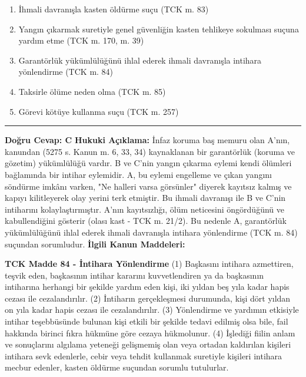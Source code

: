 \documentclass[a4paper, 11pt, twocolumn]{article}
\newenvironment{lawbox}{%
    \par\noindent
    \begin{tcolorbox}[
        colback=lawbg,
        colframe=boxcolor,
        fonttitle=\bfseries,
        boxrule=0.5pt,
        left=3pt,
        right=3pt,
        top=3pt,
        bottom=3pt,
        width=\columnwidth,
        arc=2pt,
        before skip=0.2cm,
        after skip=0.2cm
    ]
    \footnotesize\itshape
}{\end{tcolorbox}}
\begin{document}
\begin{enumerate}[label=\Alph*)]
    \item İhmali davranışla kasten öldürme suçu (TCK m. 83)
    \item Yangın çıkarmak suretiyle genel güvenliğin kasten tehlikeye sokulması suçuna yardım etme (TCK m. 170, m. 39)
    \item Garantörlük yükümlülüğünü ihlal ederek ihmali davranışla intihara yönlendirme (TCK m. 84)
    \item Taksirle ölüme neden olma (TCK m. 85)
    \item Görevi kötüye kullanma suçu (TCK m. 257)
\end{enumerate}
\vspace{0.5cm}
\hrule
\vspace{0.5cm}
\textbf{Doğru Cevap: C}
\newline
\textbf{Hukuki Açıklama:} İnfaz koruma baş memuru olan A'nın, kanundan (5275 s. Kanun m. 6, 33, 34) kaynaklanan bir garantörlük (koruma ve gözetim) yükümlülüğü vardır. B ve C'nin yangın çıkarma eylemi kendi ölümleri bağlamında bir intihar eylemidir. A, bu eylemi engelleme ve çıkan yangını söndürme imkânı varken, "Ne halleri varsa görsünler" diyerek kayıtsız kalmış ve kapıyı kilitleyerek olay yerini terk etmiştir. Bu ihmali davranışı ile B ve C'nin intiharını kolaylaştırmıştır. A'nın kayıtsızlığı, ölüm neticesini öngördüğünü ve kabullendiğini gösterir (olası kast - TCK m. 21/2). Bu nedenle A, garantörlük yükümlülüğünü ihlal ederek ihmali davranışla intihara yönlendirme (TCK m. 84) suçundan sorumludur.
\vspace{0.5cm}
\textbf{İlgili Kanun Maddeleri:}
\begin{lawbox}
\textbf{TCK Madde 84 - İntihara Yönlendirme}
\newline
(1) Başkasını intihara azmettiren, teşvik eden, başkasının intihar kararını kuvvetlendiren ya da başkasının intiharına herhangi bir şekilde yardım eden kişi, iki yıldan beş yıla kadar hapis cezası ile cezalandırılır.
\newline
(2) İntiharın gerçekleşmesi durumunda, kişi dört yıldan on yıla kadar hapis cezası ile cezalandırılır.
\newline
(3) Yönlendirme ve yardımın etkisiyle intihar teşebbüsünde bulunan kişi etkili bir şekilde tedavi edilmiş olsa bile, fail hakkında birinci fıkra hükmüne göre cezaya hükmolunur.
\newline
(4) İşlediği fiilin anlam ve sonuçlarını algılama yeteneği gelişmemiş olan veya ortadan kaldırılan kişileri intihara sevk edenlerle, cebir veya tehdit kullanmak suretiyle kişileri intihara mecbur edenler, kasten öldürme suçundan sorumlu tutulurlar.
\end{lawbox}
\end{document}
